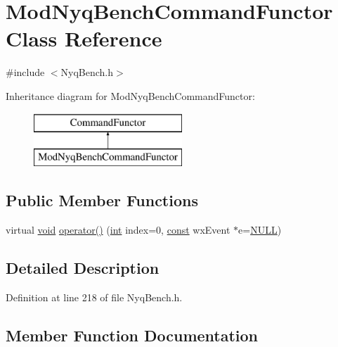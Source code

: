 \hypertarget{class_mod_nyq_bench_command_functor}{}\section{Mod\+Nyq\+Bench\+Command\+Functor Class Reference}
\label{class_mod_nyq_bench_command_functor}


{\ttfamily \#include $<$Nyq\+Bench.\+h$>$}

Inheritance diagram for Mod\+Nyq\+Bench\+Command\+Functor\+:\begin{figure}[H]
\begin{center}
\leavevmode
\includegraphics[height=2.000000cm]{class_mod_nyq_bench_command_functor}
\end{center}
\end{figure}
\subsection*{Public Member Functions}
\begin{DoxyCompactItemize}
\item 
virtual \hyperlink{sound_8c_ae35f5844602719cf66324f4de2a658b3}{void} \hyperlink{class_mod_nyq_bench_command_functor_ad9aa1d0f60724a087e6f5750df3e61da}{operator()} (\hyperlink{xmltok_8h_a5a0d4a5641ce434f1d23533f2b2e6653}{int} index=0, \hyperlink{getopt1_8c_a2c212835823e3c54a8ab6d95c652660e}{const} wx\+Event $\ast$e=\hyperlink{px__mixer_8h_a070d2ce7b6bb7e5c05602aa8c308d0c4}{N\+U\+LL})
\end{DoxyCompactItemize}


\subsection{Detailed Description}


Definition at line 218 of file Nyq\+Bench.\+h.



\subsection{Member Function Documentation}
